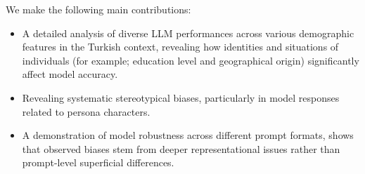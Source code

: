 We make the following main contributions:
\begin{itemize}
    \item A detailed analysis of diverse LLM performances across various demographic features in the Turkish context, revealing how identities and situations of individuals (for example; education level and geographical origin) significantly affect model accuracy.
    \item Revealing systematic stereotypical biases, particularly in model responses related to persona characters.
    \item A demonstration of model robustness across different prompt formats, shows that observed biases stem from deeper representational issues rather than prompt-level superficial differences.
\end{itemize}